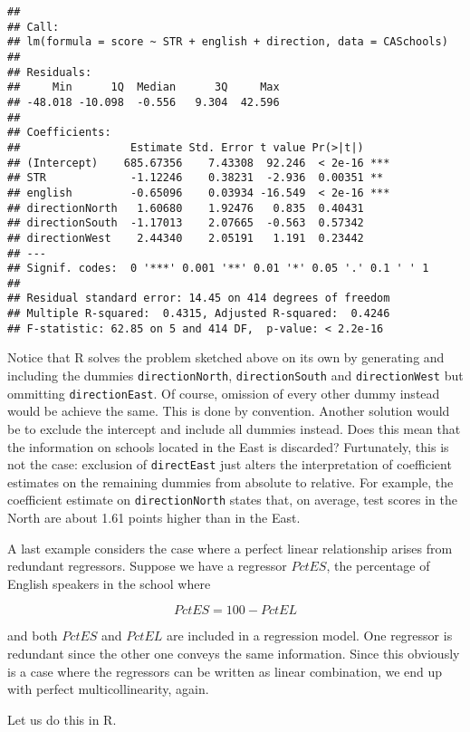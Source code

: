 \documentclass[]{book}
\theoremstyle{definition}
\theoremstyle{definition}
\theoremstyle{definition}
\theoremstyle{remark}
\begin{document}
\begin{verbatim}
## 
## Call:
## lm(formula = score ~ STR + english + direction, data = CASchools)
## 
## Residuals:
##     Min      1Q  Median      3Q     Max 
## -48.018 -10.098  -0.556   9.304  42.596 
## 
## Coefficients:
##                 Estimate Std. Error t value Pr(>|t|)    
## (Intercept)    685.67356    7.43308  92.246  < 2e-16 ***
## STR             -1.12246    0.38231  -2.936  0.00351 ** 
## english         -0.65096    0.03934 -16.549  < 2e-16 ***
## directionNorth   1.60680    1.92476   0.835  0.40431    
## directionSouth  -1.17013    2.07665  -0.563  0.57342    
## directionWest    2.44340    2.05191   1.191  0.23442    
## ---
## Signif. codes:  0 '***' 0.001 '**' 0.01 '*' 0.05 '.' 0.1 ' ' 1
## 
## Residual standard error: 14.45 on 414 degrees of freedom
## Multiple R-squared:  0.4315, Adjusted R-squared:  0.4246 
## F-statistic: 62.85 on 5 and 414 DF,  p-value: < 2.2e-16
\end{verbatim}

Notice that R solves the problem sketched above on its own by generating
and including the dummies \texttt{directionNorth},
\texttt{directionSouth} and \texttt{directionWest} but ommitting
\texttt{directionEast}. Of course, omission of every other dummy instead
would be achieve the same. This is done by convention. Another solution
would be to exclude the intercept and include all dummies instead. Does
this mean that the information on schools located in the East is
discarded? Furtunately, this is not the case: exclusion of
\texttt{directEast} just alters the interpretation of coefficient
estimates on the remaining dummies from absolute to relative. For
example, the coefficient estimate on \texttt{directionNorth} states
that, on average, test scores in the North are about 1.61 points higher
than in the East.

A last example considers the case where a perfect linear relationship
arises from redundant regressors. Suppose we have a regressor \(PctES\),
the percentage of English speakers in the school where

\[ PctES = 100 -  PctEL\]

and both \(PctES\) and \(PctEL\) are included in a regression model. One
regressor is redundant since the other one conveys the same information.
Since this obviously is a case where the regressors can be written as
linear combination, we end up with perfect multicollinearity, again.

Let us do this in R.
\end{document}
